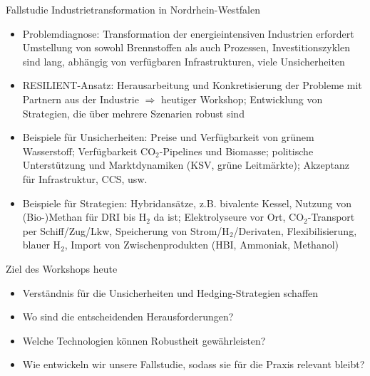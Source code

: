 \documentclass[10pt,aspectratio=169,dvipsnames]{beamer}
\begin{document}
\begin{frame}{Fallstudie Industrietransformation in Nordrhein-Westfalen}
  \begin{itemize}
    \item \alert{Problemdiagnose}: Transformation der energieintensiven Industrien erfordert Umstellung von sowohl Brennstoffen als auch Prozessen, Investitionszyklen sind lang, abhängig von verfügbaren Infrastrukturen, viele Unsicherheiten
    \item \alert{RESILIENT-Ansatz}: Herausarbeitung und Konkretisierung der Probleme mit Partnern aus der Industrie $\Rightarrow$ \alert{heutiger Workshop}; Entwicklung von Strategien, die über mehrere Szenarien robust sind
    \item Beispiele für \alert{Unsicherheiten}: Preise und Verfügbarkeit von grünem Wasserstoff; Verfügbarkeit CO$_2$-Pipelines und Biomasse; politische Unterstützung und Marktdynamiken (KSV, grüne Leitmärkte); Akzeptanz für Infrastruktur, CCS, usw.
  \item Beispiele für \alert{Strategien}: Hybridansätze, z.B. bivalente Kessel, Nutzung von (Bio-)Methan für DRI bis H$_2$ da ist; Elektrolyseure vor Ort, CO$_2$-Transport per Schiff/Zug/Lkw, Speicherung von Strom/H$_2$/Derivaten, Flexibilisierung, blauer H$_2$, Import von Zwischenprodukten (HBI, Ammoniak, Methanol)
  \end{itemize}

\end{frame}


\begin{frame}{Ziel des Workshops heute}
  \begin{itemize}
    \item Verständnis für die Unsicherheiten und Hedging-Strategien schaffen
    \item Wo sind die \alert{entscheidenden Herausforderungen}?
    \item Welche Technologien können Robustheit gewährleisten?
    \item Wie entwickeln wir unsere Fallstudie, sodass sie für die Praxis relevant bleibt?
  \end{itemize}

\end{frame}
\end{document}
